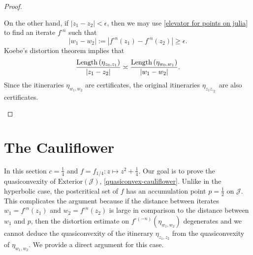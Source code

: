 \begin{proof}
\begin{enumerate}[label=\normalfont(\roman*)]
On the other hand, if $\left|z_{1}-z_{2}\right|<\epsilon$, then
we may use  \cref{elevator for points on julia} to find an iterate $f^{\circ n}$ such that 
\begin{equation}
	|w_1-w_2|:=\left|f^{\circ n}(z_{1})-f^{\circ n}(z_{2})\right|\geq\epsilon.
\end{equation}
Koebe's distortion theorem implies that 
\begin{equation}
	\frac{\operatorname{Length}\left(\eta_{z_{0},z_{1}}\right)}{|z_1-z_2|}\asymp\frac{\operatorname{Length}\left(\eta_{w_0,w_1}\right)}{|w_1-w_2|}.
\end{equation}
Since the itineraries $\eta_{w_1,w_2}$ are certificates, the original itineraries $\eta_{z_1z,_2}$ are also certificates. 
\begin{comment}
By a distortion estimate
\begin{equation*}
\Length\left(\eta_{z_{0},z_{1}}\right)\asymp\frac{\Length\left(\eta_{w_0,w_1}\right)}{\left|\left(f^{\circ n}\right)'\left(\zeta\right)\right|}
\end{equation*}
 for some point $\zeta \in \mathcal{J}$. The denominator grows
with $n$ exponentially at rate $\theta$, while the numerator has
a bound of the form 
\[
\Length\left(\eta_{w_1,w_2}\right)\lesssim\left|w_1-w_2\right|\lesssim\theta^{n}\left|z_{1}-z_{2}\right|.
\]
Altogether 
\[
\Length\left(\eta_{z_{1},z_{2}}\right)\lesssim\frac{\theta^{n}\left|z_{1}-z_{2}\right|}{\theta^{n}}=\left|z_{1}-z_{2}\right|
\]
 so $\eta_{z_{1},z_{2}}$ is a quasiconvexity certificate.
\end{comment}

\end{enumerate}
\end{proof}

\section{The Cauliflower}
In this section $c=\frac 14$ and $f=f_{1/4}: z\mapsto z^2+ \frac 14$.
Our goal is to prove the quasiconvexity of $\mathrm{Exterior}(\mathcal{J})$, \cref{quasiconvex-cauliflower}.
Unlike in the hyperbolic case, the postcritical set of $f$ has an accumulation point $p=\frac 12$ on $\mathcal J$. This complicates the argument because if the distance between iterates $w_1=f^{\circ n}(z_1)$ and $w_2=f^{\circ n}(z_2)$ is large in comparison to the distance between $w_1$ and $p$, then the distortion estimate on $f^{\circ (-n)}(\eta_{w_1,w_2})$ degenerates and we cannot deduce the quasiconvexity of the itinerary $\eta_{z_1,z_2}$ from the quasiconvexity of $\eta_{w_1,w_2}$. We provide a direct argument for this case.

